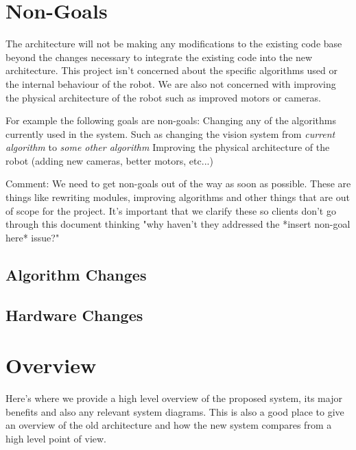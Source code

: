 \documentclass[english,12pt]{scrartcl}
\begin{document}
    \section{Non-Goals}
        The architecture will not be making any modifications to the existing code base beyond the
        changes necessary to integrate the existing code into the new architecture. This project
        isn't concerned about the specific algorithms used or the internal behaviour of the robot.
        We are also not concerned with improving the physical architecture of the robot such as
        improved motors or cameras.
    
        For example the following goals are non-goals:
        Changing any of the algorithms currently used in the system. Such as changing the vision
        system from \emph{current algorithm} to \emph{some other algorithm} Improving the physical
        architecture of the robot (adding new cameras, better motors, etc...)
        
        Comment: We need to get non-goals out of the way as soon as possible. These are things like
        rewriting modules, improving algorithms and other things that are out of scope for the
        project. It's important that we clarify these so clients don't go through this document
        thinking "why haven't they addressed the *insert non-goal here* issue?"
        
        \subsection{Algorithm Changes}
            
        \subsection{Hardware Changes}
        
    \section{Overview}
        Here's where we provide a high level overview of the proposed system, its major benefits and 
        also any relevant system diagrams. This is also a good place to give an overview of the old
        architecture and how the new system compares from a high level point of view.
        
\end{document}
